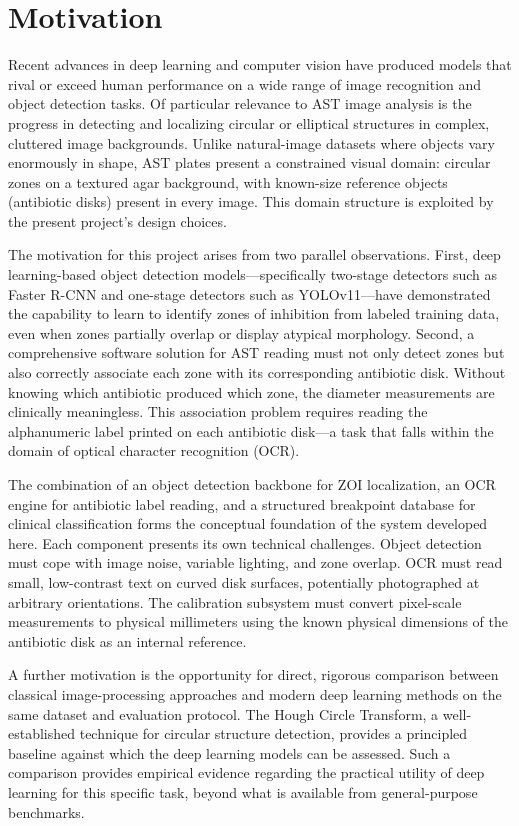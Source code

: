 \section{Motivation}

Recent advances in deep learning and computer vision have produced models that rival or exceed
human performance on a wide range of image recognition and object detection tasks. Of particular
relevance to AST image analysis is the progress in detecting and localizing circular or
elliptical structures in complex, cluttered image backgrounds. Unlike natural-image datasets where
objects vary enormously in shape, AST plates present a constrained visual domain: circular zones
on a textured agar background, with known-size reference objects (antibiotic disks) present in
every image. This domain structure is exploited by the present project's design choices.

The motivation for this project arises from two parallel observations. First, deep learning-based
object detection models---specifically two-stage detectors such as Faster R-CNN and one-stage
detectors such as YOLOv11---have demonstrated the capability to learn to identify zones of
inhibition from labeled training data, even when zones partially overlap or display atypical
morphology. Second, a comprehensive software solution for AST reading must not only detect zones
but also correctly associate each zone with its corresponding antibiotic disk. Without knowing
which antibiotic produced which zone, the diameter measurements are clinically meaningless.
This association problem requires reading the alphanumeric label printed on each antibiotic disk---a
task that falls within the domain of optical character recognition (OCR).

The combination of an object detection backbone for ZOI localization, an OCR engine for antibiotic
label reading, and a structured breakpoint database for clinical classification forms the conceptual
foundation of the system developed here. Each component presents its own technical challenges.
Object detection must cope with image noise, variable lighting, and zone overlap. OCR must read
small, low-contrast text on curved disk surfaces, potentially photographed at arbitrary orientations.
The calibration subsystem must convert pixel-scale measurements to physical millimeters using
the known physical dimensions of the antibiotic disk as an internal reference.

A further motivation is the opportunity for direct, rigorous comparison between classical
image-processing approaches and modern deep learning methods on the same dataset and evaluation
protocol. The Hough Circle Transform, a well-established technique for circular structure detection,
provides a principled baseline against which the deep learning models can be assessed. Such a
comparison provides empirical evidence regarding the practical utility of deep learning for this
specific task, beyond what is available from general-purpose benchmarks.

